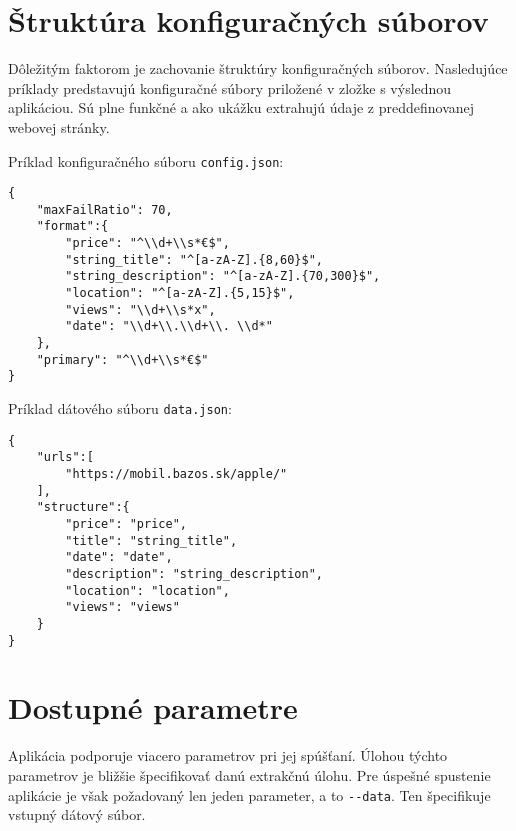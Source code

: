 \section{Štruktúra konfiguračných súborov}

Dôležitým faktorom je zachovanie štruktúry konfiguračných súborov. Nasledujúce príklady predstavujú konfiguračné súbory priložené v zložke s výslednou aplikáciou. Sú plne funkčné a ako ukážku extrahujú údaje z preddefinovanej webovej stránky.

Príklad konfiguračného súboru \texttt{config.json}:
\bigskip
\begin{lstlisting}
{
    "maxFailRatio": 70,
    "format":{
        "price": "^\\d+\\s*€$",
        "string_title": "^[a-zA-Z].{8,60}$",
        "string_description": "^[a-zA-Z].{70,300}$",
        "location": "^[a-zA-Z].{5,15}$",
        "views": "\\d+\\s*x",
        "date": "\\d+\\.\\d+\\. \\d*"
    },
    "primary": "^\\d+\\s*€$"
}
\end{lstlisting}

\newpage

Príklad dátového súboru \texttt{data.json}:
\bigskip

\begin{lstlisting}
{
    "urls":[
        "https://mobil.bazos.sk/apple/"
    ],
    "structure":{
        "price": "price",
        "title": "string_title",
        "date": "date",
        "description": "string_description",
        "location": "location",
        "views": "views"
    }
}
\end{lstlisting}

\bigskip

\section{Dostupné parametre}

Aplikácia podporuje viacero parametrov pri jej spúšťaní. Úlohou týchto parametrov je bližšie špecifikovať danú extrakčnú úlohu. Pre úspešné spustenie aplikácie je však požadovaný len jeden parameter, a to \texttt{-{}-data}. Ten špecifikuje vstupný dátový súbor.

